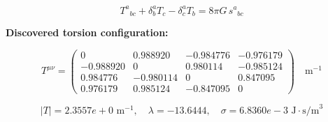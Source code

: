 
\begin{equation}
  T^a{}_{bc} + \delta^a_b T_c - \delta^a_c T_b = 8\pi G \, s^a{}_{bc}
\end{equation}

\textbf{Discovered torsion configuration:}

\begin{equation}
  T^{\mu\nu} = \begin{pmatrix}
    0 & 0.988920 & -0.984776 & -0.976179 \\
    -0.988920 & 0 & 0.980114 & -0.985124 \\
    0.984776 & -0.980114 & 0 & 0.847095 \\
    0.976179 & 0.985124 & -0.847095 & 0
  \end{pmatrix} \quad \text{m}^{-1}
\end{equation}

\begin{equation}
  |T| = 2.3557e+0 \text{ m}^{-1}, \quad
  \lambda = -13.6444, \quad
  \sigma = 6.8360e-3 \text{ J}\cdot\text{s/m}^3
\end{equation}